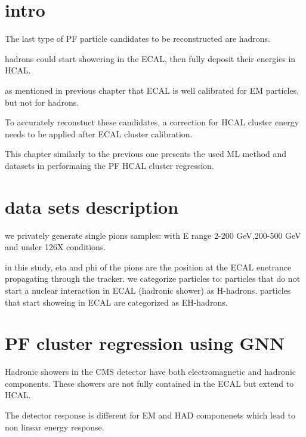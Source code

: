 
\section{intro}


The last type of PF particle candidates to be reconstructed are hadrons.

hadrons could start showering in the ECAL, then fully deposit their energies in HCAL.

as mentioned in previous chapter that ECAL is well calibrated for EM particles, but not for hadrons.

To accurately reconstuct these candidates, a correction for HCAL cluster energy needs to be applied after ECAL cluster calibration.

This chapter similarly to the previous one presents the used ML method and datasets in performaing the PF HCAL cluster regression.


\section{data sets description}
we privately generate single pions samples: with  E range 2-200 GeV,200-500 GeV and under 126X conditions.

in this study, eta and phi of the pions are the position at the ECAL enetrance propagating through the tracker.  
we categorize particles to: 
particles that do not start a nuclear interaction in ECAL (hadronic shower) as H-hadrons.
particles that start showeing in ECAL are categorized as EH-hadrons.  

\section{PF cluster regression  using GNN}

Hadronic showers in the CMS detector have both electromagnetic and hadronic components.
These showers are not fully contained in the ECAL but extend to HCAL.

The detector response is different for EM and HAD componenets which lead to non linear energy response.

